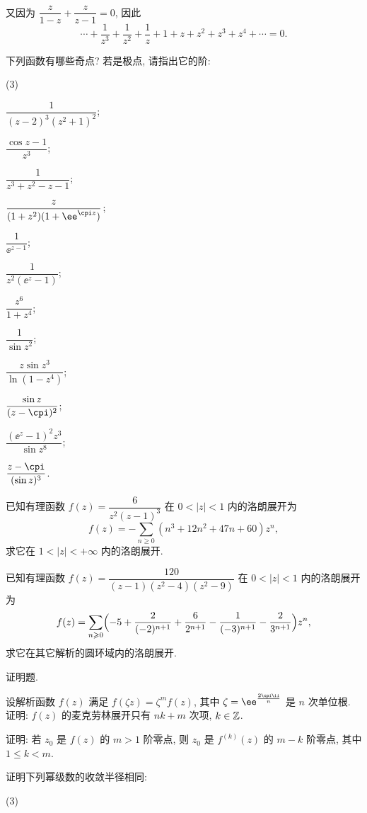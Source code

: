 \begin{homework}
\begin{subex}
\begin{align*}
      \end{align*}
      又因为 $\dfrac{z}{1-z}+\dfrac{z}{z-1}=0$, 因此
      \[
        \cdots+\frac1{z^3}+\frac1{z^2}+\frac1z+1+z+z^2+z^3+z^4+\cdots=0.
      \]
    \item 下列函数有哪些奇点? 若是极点, 请指出它的阶:
      \begin{subsubex}(3)
        \item $\dfrac1{(z-2)^3(z^2+1)^2}$;
        \item $\dfrac{\cos z-1}{z^3}$;
        \item $\dfrac1{z^3+z^2-z-1}$;
        \item $\dfrac z{(1+z^2)(1+\ee^{\cpi z})}$;
        \item $\dfrac1{\ee^{z-1}}$;
        \item $\dfrac1{z^2(\ee^z-1)}$;
        \item $\dfrac{z^6}{1+z^4}$;
        \item $\dfrac1{\sin z^2}$;
        \item $\dfrac{z\sin z^3}{\ln(1-z^4)}$;
        \item $\dfrac{\sin z}{(z-\cpi)^2}$;
        \item $\dfrac{(\ee^z-1)^2z^3}{\sin z^8}$;
        \item $\dfrac{z-\cpi}{(\sin z)^3}$.
      \end{subsubex}
    \item \optionalex 已知有理函数 $f(z)=\dfrac{6}{z^2(z-1)^3}$ 在 $0<|z|<1$ 内的洛朗展开为
      \[
        f(z)=-\sum_{n\ge 0}(n^3+12n^2+47n+60)z^n,
      \]
      求它在 $1<|z|<+\infty$ 内的洛朗展开.
    \item \optionalex 已知有理函数 $f(z)=\dfrac{120}{(z-1)(z^2-4)(z^2-9)}$ 在 $0<|z|<1$ 内的洛朗展开为
      \[
        f(z)=\sum_{n\ge 0}\Bigl(-5+\frac2{(-2)^{n+1}}+\frac6{2^{n+1}}-\frac1{(-3)^{n+1}}-\frac2{3^{n+1}}\Bigr)z^n,
      \]
      求它在其它解析的圆环域内的洛朗展开.
  \end{subex}
  \item 证明题.
  \begin{subex}
    \item 设解析函数 $f(z)$ 满足 $f(\zeta z)=\zeta^m f(z)$, 其中 $\zeta=\ee^{\frac{2\cpi\ii}n}$ 是 $n$ 次单位根.
      证明: $f(z)$ 的麦克劳林展开只有 $nk+m$ 次项, $k\in\BZ$.
    \item 证明: 若 $z_0$ 是 $f(z)$ 的 $m>1$ 阶零点, 则 $z_0$ 是 $f^{(k)}(z)$ 的 $m-k$ 阶零点, 其中 $1\le k<m$.
    \item 证明下列幂级数的收敛半径相同:
      \begin{subsubex}(3)

\end{subsubex}
\end{subex}
\end{homework}
